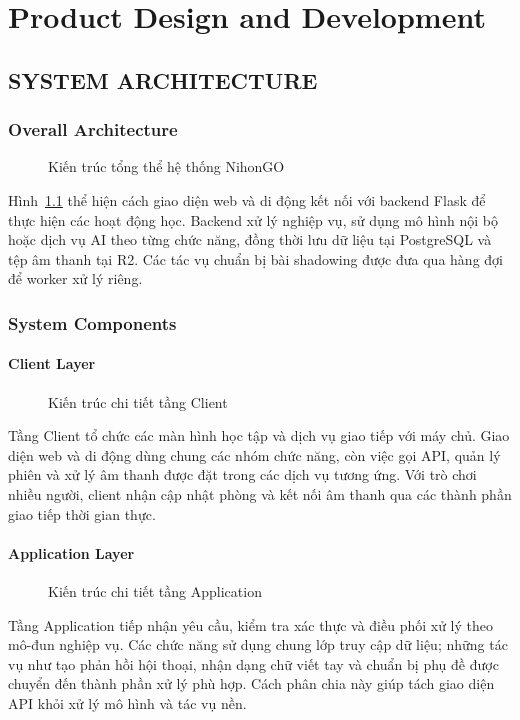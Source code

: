 \chapter{Product Design and Development}

\section{SYSTEM ARCHITECTURE}
\subsection{Overall Architecture}

\begin{figure}[htbp]
  \centering
  
  \caption{Kiến trúc tổng thể hệ thống NihonGO}
  \label{fig:overall-architecture}
\end{figure}
Hình~\ref{fig:overall-architecture} thể hiện cách giao diện web và di động kết nối với backend Flask để thực hiện các hoạt động học. Backend xử lý nghiệp vụ, sử dụng mô hình nội bộ hoặc dịch vụ AI theo từng chức năng, đồng thời lưu dữ liệu tại PostgreSQL và tệp âm thanh tại R2. Các tác vụ chuẩn bị bài shadowing được đưa qua hàng đợi để worker xử lý riêng.
\newpage

\clearpage
\subsection{System Components}
\subsubsection{Client Layer}
\begin{figure}[htbp]
  \centering
  
  \caption{Kiến trúc chi tiết tầng Client}
  \label{fig:client-layer}
\end{figure}
Tầng Client tổ chức các màn hình học tập và dịch vụ giao tiếp với máy chủ. Giao diện web và di động dùng chung các nhóm chức năng, còn việc gọi API, quản lý phiên và xử lý âm thanh được đặt trong các dịch vụ tương ứng. Với trò chơi nhiều người, client nhận cập nhật phòng và kết nối âm thanh qua các thành phần giao tiếp thời gian thực.
\clearpage
\subsubsection{Application Layer}
\begin{figure}[htbp]
  \centering
  
  \caption{Kiến trúc chi tiết tầng Application}
  \label{fig:application-layer}
\end{figure}
Tầng Application tiếp nhận yêu cầu, kiểm tra xác thực và điều phối xử lý theo mô-đun nghiệp vụ. Các chức năng sử dụng chung lớp truy cập dữ liệu; những tác vụ như tạo phản hồi hội thoại, nhận dạng chữ viết tay và chuẩn bị phụ đề được chuyển đến thành phần xử lý phù hợp. Cách phân chia này giúp tách giao diện API khỏi xử lý mô hình và tác vụ nền.
\clearpage

